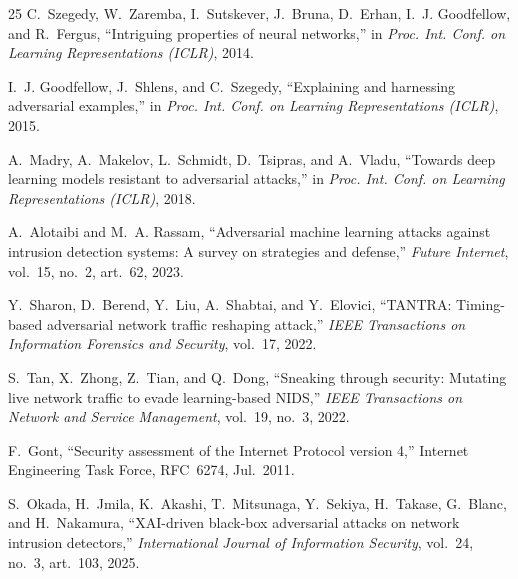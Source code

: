\begin{thebibliography}{25}
C.~Szegedy, W.~Zaremba, I.~Sutskever, J.~Bruna, D.~Erhan, I.~J. Goodfellow, and R.~Fergus, ``Intriguing properties of neural networks,'' in \textit{Proc. Int. Conf. on Learning Representations (ICLR)}, 2014.

I.~J. Goodfellow, J.~Shlens, and C.~Szegedy, ``Explaining and harnessing adversarial examples,'' in \textit{Proc. Int. Conf. on Learning Representations (ICLR)}, 2015.

A.~Madry, A.~Makelov, L.~Schmidt, D.~Tsipras, and A.~Vladu, ``Towards deep learning models resistant to adversarial attacks,'' in \textit{Proc. Int. Conf. on Learning Representations (ICLR)}, 2018.

A.~Alotaibi and M.~A. Rassam, ``Adversarial machine learning attacks against intrusion detection systems: A survey on strategies and defense,'' \textit{Future Internet}, vol.~15, no.~2, art.~62, 2023.

Y.~Sharon, D.~Berend, Y.~Liu, A.~Shabtai, and Y.~Elovici, ``TANTRA: Timing-based adversarial network traffic reshaping attack,'' \textit{IEEE Transactions on Information Forensics and Security}, vol.~17, 2022.

S.~Tan, X.~Zhong, Z.~Tian, and Q.~Dong, ``Sneaking through security: Mutating live network traffic to evade learning-based NIDS,'' \textit{IEEE Transactions on Network and Service Management}, vol.~19, no.~3, 2022.



F.~Gont, ``Security assessment of the Internet Protocol version 4,'' Internet Engineering Task Force, RFC~6274, Jul.~2011.

S.~Okada, H.~Jmila, K.~Akashi, T.~Mitsunaga, Y.~Sekiya, H.~Takase, G.~Blanc, and H.~Nakamura, ``XAI-driven black-box adversarial attacks on network intrusion detectors,'' \textit{International Journal of Information Security}, vol.~24, no.~3, art.~103, 2025.

\end{thebibliography}
